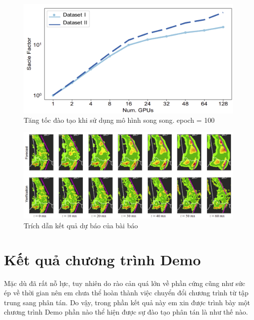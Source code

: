 \documentclass[11pt,a4paper]{article}
\numberwithin{equation}{subsection}
\numberwithin{figure}{subsection}
\numberwithin{table}{subsection}
\begin{document}
\begin{figure}[!h]
	\begin{center}
		\includegraphics[scale=0.5]{MIT_3.PNG}
	\end{center}
	\caption{Tăng tốc đào tạo khi sử dụng mô hình song song. epoch = 100 }
\end{figure}

\begin{figure}[!h]
	\begin{center}
		\includegraphics[scale=0.62]{MIT_4.PNG}
	\end{center}
	\caption{Trích dẫn kết quả dự báo của bài báo }
\end{figure}


\newpage

\section{Kết quả chương trình Demo}
Mặc dù đã rất nỗ lực, tuy nhiên do rào cản quá lớn về phần cứng cũng như sức ép về thời gian nên em chưa thể hoàn thành việc chuyển đổi chương trình từ tập trung sang phân tán. Do vậy, trong phần kết quả này em xin được trình bày một chương trình Demo phần nào thể hiện được sự đào tạo phân tán là như thế nào.\\
\end{document}
